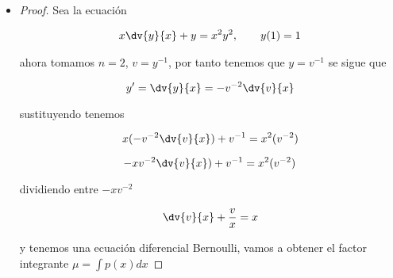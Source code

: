 \begin{itemize}
\begin{proof}
$$x^6\dv{v}{x}+x^6\frac{6v}{x}=-x^6\frac{9}{x^2}$$

y esto es el diferencial de v por $x^6$

$$d(v\cdot x^6)=-x^6\frac{9}{x^2}$$

integramos para obtener

$$v\cdot x^6=\int -x^6\frac{9}{x^2} dx$$

despejando v tenemos

$$v=\frac{1}{x^6}\int -x^6\frac{9}{x^2} dx$$

resolvemos la integral 

$$v=-\frac{9}{5x}+\frac{C}{x^6}$$

como $v=y^{-3}=\frac{1}{y^3}$

tenemos que 

$$y^3=\frac{5x^7}{-9x^6+5xC}$$

operando con los valores iniciales tenemos

$$(\frac{1}{2})^3=\frac{5}{-9+5C}$$

despejando C obtenemos

$$C=\frac{49}{5}$$

por tanto la solución a la ecuación es

$$y^3=\frac{5x^7}{-9x^6+5x(\frac{49}{5})}$$

$$y=\sqrt[3]{\frac{5x^7}{-9x^6+5x(\frac{49}{5})}}$$

\end{proof}

\item \begin{proof}

Sea la ecuación 

\begin{align*}
    x \dv{y}{x} + y = x^{2}y^{2}, \qquad y(1)=1
\end{align*}


ahora tomamos $n=2$, $v=y^{-1}$, por tanto tenemos que $y=v^{-1}$  se sigue que

$$y'=\dv{y}{x}=-v^{-2}\dv{v}{x}$$

sustituyendo tenemos

$$x(-v^{-2}\dv{v}{x})+v^{-1}=x^2(v^{-2})$$

$$-xv^{-2}\dv{v}{x})+v^{-1}=x^2(v^{-2}) $$

dividiendo entre $-xv^{-2}$ 

$$\dv{v}{x}+\frac{v}{x}=x$$


y tenemos una ecuación diferencial Bernoulli, vamos a obtener el factor integrante $\mu=\int p(x)dx$


\end{proof}
\end{itemize}
